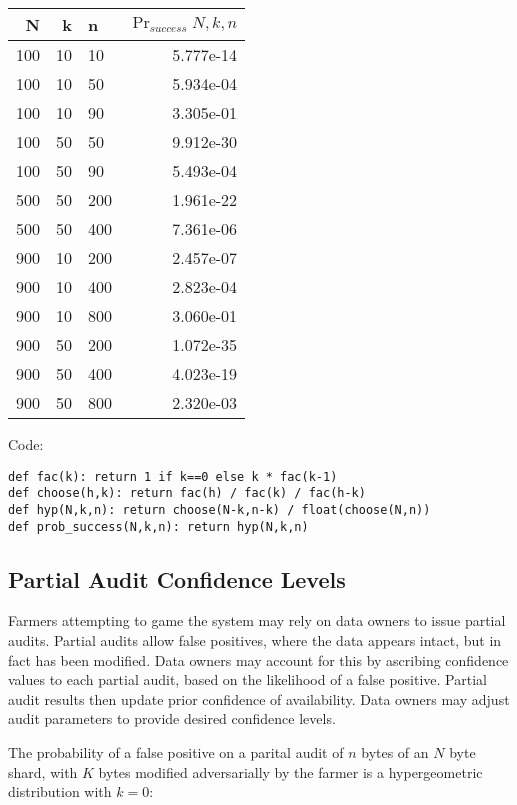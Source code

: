 \documentclass[a4paper,10pt]{article}
\begin{document}
\begin{table}[hbt!]
\begin{center}
\begin{tabular}{r r l r}
N & k & n & $\Pr_{success}{N,k,n}$\\
\hline 100 & 10 & 10  & 5.777e-14\\
\hline 100 & 10 & 50  & 5.934e-04\\
\hline 100 & 10 & 90  & 3.305e-01\\
\hline 100 & 50 & 50  & 9.912e-30\\
\hline 100 & 50 & 90  & 5.493e-04\\
\hline 500 & 50 & 200 & 1.961e-22\\
\hline 500 & 50 & 400 & 7.361e-06\\
\hline 900 & 10 & 200 & 2.457e-07\\
\hline 900 & 10 & 400 & 2.823e-04\\
\hline 900 & 10 & 800 & 3.060e-01\\
\hline 900 & 50 & 200 & 1.072e-35\\
\hline 900 & 50 & 400 & 4.023e-19\\
\hline 900 & 50 & 800 & 2.320e-03\\
\end{tabular}
\end{center}
\end{table}

Code:
\begin{lstlisting}
def fac(k): return 1 if k==0 else k * fac(k-1)
def choose(h,k): return fac(h) / fac(k) / fac(h-k)
def hyp(N,k,n): return choose(N-k,n-k) / float(choose(N,n))
def prob_success(N,k,n): return hyp(N,k,n)
\end{lstlisting}

\subsection{Partial Audit Confidence Levels}

Farmers attempting to game the system may rely on data owners to issue partial
audits. Partial audits allow false positives, where the data appears intact, but
in fact has been modified. Data owners may account for this by ascribing
confidence values to each partial audit, based on the likelihood of a false
positive. Partial audit results then update prior confidence of availability.
Data owners may adjust audit parameters to provide desired confidence levels.

The probability of a false positive on a parital audit of $ n $ bytes of an $ N
$ byte shard, with $ K $ bytes modified adversarially by the farmer is a
hypergeometric distribution with $ k = 0 $:
\end{document}
